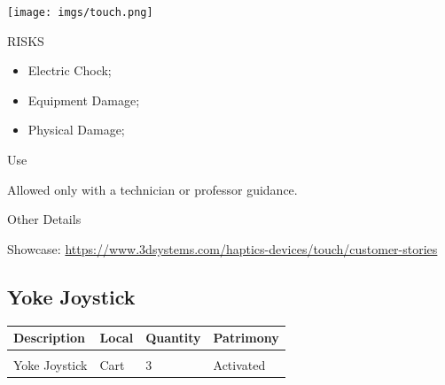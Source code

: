 \begin{multicols}{2}

\texttt{[image: imgs/touch.png]}

\columnbreak

\begin{mdframed}[roundcorner=10pt, linecolor=red, linewidth=2pt]
\vspace{1em}
{\Large {\color{red}RISKS}}
\vspace{1em}

\begin{itemize}
    \item Electric Chock;
    \item Equipment Damage;
    \item Physical Damage;
\end{itemize}

\vspace{1em}
\end{mdframed}

\vspace{2em}

{\Large Use}
\vspace{1em}

Allowed only with a technician or professor guidance.
\end{multicols}

{\Large Other Details}
\vspace{1em}

Showcase: \url{https://www.3dsystems.com/haptics-devices/touch/customer-stories}
\newpage

\subsection{Yoke Joystick}
\begin{tabularx}{\textwidth}{ Y  Y  Y  Y }
    \textbf{Description} &  \textbf{Local} &  \textbf{Quantity} & \textbf{Patrimony}\\
    \hline \\
     Yoke Joystick & Cart & 3 & Activated
\end{tabularx}
\vspace{1cm}

